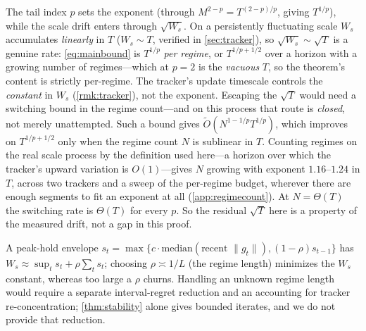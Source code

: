 \documentclass{article}
\newcommand{\norm}[1]{\lVert #1 \rVert}
\newcommand{\gt}{g_t}
\begin{document}
\begin{remark}
\label{rmk:regime}
The tail index $p$ sets the exponent (through $M^{2-p}=T^{(2-p)/p}$, giving $T^{1/p}$),
while the scale drift enters through $\sqrt{W_s}$. On a persistently fluctuating scale
$W_s$ accumulates \emph{linearly} in $T$ ($W_s\sim T$, verified in \cref{sec:tracker}), so
$\sqrt{W_s}\sim\sqrt T$ is a genuine rate: \eqref{eq:mainbound} is $T^{1/p}$ \emph{per
regime}, or $T^{1/p+1/2}$ over a horizon with a growing number of regimes---which at
$p=2$ is the \emph{vacuous} $T$, so the theorem's content is strictly per-regime. The tracker's
update timescale controls the \emph{constant} in $W_s$ (\cref{rmk:tracker}), not the
exponent. Escaping the $\sqrt T$ would need a switching bound in the regime count---and on
this process that route is \emph{closed}, not merely unattempted. Such a bound gives
$\tilde O(N^{1-1/p}T^{1/p})$, which improves on $T^{1/p+1/2}$ only when the regime count $N$ is
sublinear in $T$. Counting regimes on the real scale process by the definition used here---a
horizon over which the tracker's upward variation is $O(1)$---gives $N$ growing with exponent
$1.16$--$1.24$ in $T$, across two trackers and a sweep of the per-regime budget, wherever there
are enough segments to fit an exponent at all (\cref{app:regimecount}). At $N=\Theta(T)$ the
switching rate is $\Theta(T)$ for every $p$. So the residual $\sqrt T$ here is a property of the
measured drift, not a gap in this proof.
\end{remark}

\begin{remark}
\label{rmk:tracker}
A peak-hold envelope $s_t=\max\{c\cdot\mathrm{median}(\text{recent }\norm{\gt}),(1-\rho)s_{t-1}\}$
has $W_s\approx\sup_t s_t+\rho\sum_t s_t$; choosing $\rho\asymp1/L$ (the regime length)
minimizes the $W_s$ constant, whereas too large a $\rho$ churns. Handling an unknown regime
length would require a separate interval-regret reduction and an accounting for tracker
re-concentration; \cref{thm:stability} alone gives bounded iterates, and we do not provide that reduction.
\end{remark}
\end{document}
